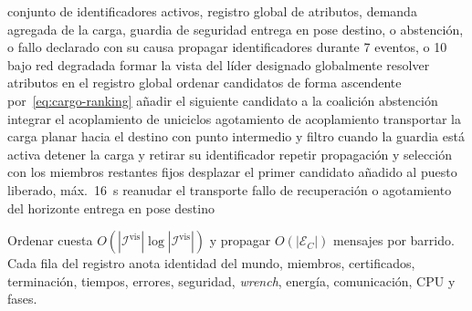 \begin{algorithm}[!htbp]
\caption{Demostrador Cargo híbrido: selección, acoplamiento, transporte y sustitución}
\label{alg:cargo-hibrido}
\begin{algorithmic}[1]
\Require conjunto de identificadores activos, registro global de atributos,
         demanda agregada de la carga, guardia de seguridad
\Ensure entrega en pose destino, o abstención, o fallo declarado con su causa
\State propagar identificadores durante 7 eventos, o 10 bajo red degradada
\State formar la vista del líder designado globalmente
\State resolver atributos en el registro global
\State ordenar candidatos de forma ascendente por~\eqref{eq:cargo-ranking}
  \State añadir el siguiente candidato a la coalición
\EndWhile
{}
  \Return abstención
\EndIf
\State integrar el acoplamiento de uniciclos
  \Return agotamiento de acoplamiento
\EndIf
\State transportar la carga planar hacia el destino con punto intermedio y
       filtro cuando la guardia está activa
  \State detener la carga y retirar su identificador
  \State repetir propagación y selección con los miembros restantes fijos
  \State desplazar el primer candidato añadido al puesto liberado, máx.\ 16~s
    \State reanudar el transporte
  \Else
    \Return fallo de recuperación o agotamiento del horizonte
  \EndIf
\EndIf
\Return entrega en pose destino
\end{algorithmic}
\end{algorithm}

Ordenar cuesta $O(|\mathcal I^{\mathrm{vis}}|\log |\mathcal I^{\mathrm{vis}}|)$ y
propagar $O(|\mathcal E_C|)$ mensajes por barrido. Cada fila del registro anota
identidad del mundo, miembros, certificados, terminación, tiempos, errores,
seguridad, \emph{wrench}, energía, comunicación, CPU y fases.

